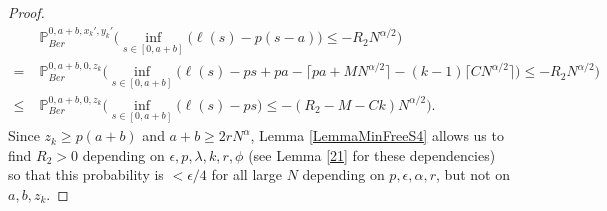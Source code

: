 \begin{proof}
\begin{align*}
		& \mathbb{P}^{0, a+b, x_k', y_k'}_{Ber} \Big( \inf_{s\in[0,a+b]} \big(\ell(s) - p(s-a)\big) \leq -R_2 N^{\alpha/2} \Big)\\
		= \; & \mathbb{P}^{0, a+b, 0, z_k}_{Ber} \Big( \inf_{s\in[0,a+b]} \big(\ell(s) - ps + pa - \lceil pa + MN^{\alpha/2}\rceil - (k-1)\lceil CN^{\alpha/2}\rceil\big) \leq -R_2 N^{\alpha/2} \Big)\\
		\leq \; & \mathbb{P}^{0, a+b, 0, z_k}_{Ber} \Big( \inf_{s\in[0,a+b]} \big(\ell(s) - ps\big) \leq -(R_2 - M - Ck) N^{\alpha/2} \Big).
		\end{align*}
		Since $z_k\geq p(a+b)$ and $a+b \geq 2rN^\alpha$, Lemma \ref{LemmaMinFreeS4} allows us to find $R_2>0$ depending on $\epsilon,p,\lambda,k,r,\phi$ (see Lemma \ref{21} for these dependencies) so that this probability is $<\epsilon/4$ for all large $N$ depending on $p,\epsilon,\alpha,r$, but not on $a,b,z_k$.
		

\end{proof}
